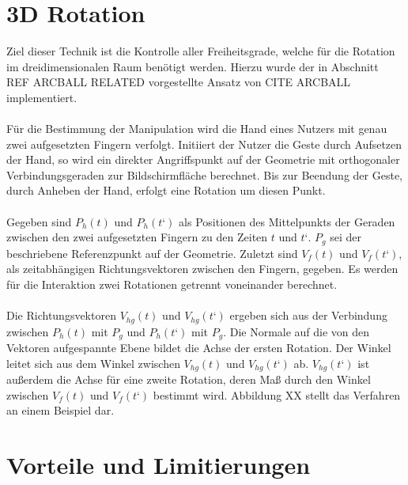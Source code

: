 \section{3D Rotation}
\label{sec:3d_rotation}

Ziel dieser Technik ist die Kontrolle aller Freiheitsgrade, welche für die Rotation im dreidimensionalen Raum benötigt werden. Hierzu wurde der in Abschnitt REF ARCBALL RELATED vorgestellte Ansatz von CITE ARCBALL implementiert. 
\\\\
Für die Bestimmung der Manipulation wird die Hand eines Nutzers mit genau zwei aufgesetzten Fingern verfolgt. Initiiert der Nutzer die Geste durch Aufsetzen der Hand, so wird ein direkter Angriffspunkt auf der Geometrie mit orthogonaler Verbindungsgeraden zur Bildschirmfläche berechnet. Bis zur Beendung der Geste, durch Anheben der Hand, erfolgt eine Rotation um diesen Punkt.
\\\\
Gegeben sind $P_h(t)$ und $P_h(t‘)$ als Positionen des Mittelpunkts der Geraden zwischen den zwei aufgesetzten Fingern zu den Zeiten $t$ und $t‘$. $P_g$ sei der beschriebene Referenzpunkt auf der Geometrie. Zuletzt sind $V_f(t)$ und $V_f(t‘)$, als zeitabhängigen Richtungsvektoren zwischen den Fingern, gegeben. Es werden für die Interaktion zwei Rotationen getrennt voneinander berechnet.
\\\\
Die Richtungsvektoren $V_{hg}(t)$ und $V_{hg}(t‘)$ ergeben sich aus der Verbindung zwischen $P_h(t)$ mit $P_g$ und $P_h(t‘)$ mit $P_g$. Die Normale auf die von den Vektoren aufgespannte Ebene bildet die Achse der ersten Rotation. Der Winkel leitet sich aus dem Winkel zwischen $V_{hg}(t)$ und $V_{hg}(t‘)$ ab. $V_{hg}(t‘)$ ist außerdem die Achse für eine zweite Rotation, deren Maß durch den Winkel zwischen $V_f(t)$ und $V_f(t‘)$ bestimmt wird. Abbildung XX stellt das Verfahren an einem Beispiel dar.


\section{Vorteile und Limitierungen}
\label{sec:vorteile_und_limitierungen_explizit}

